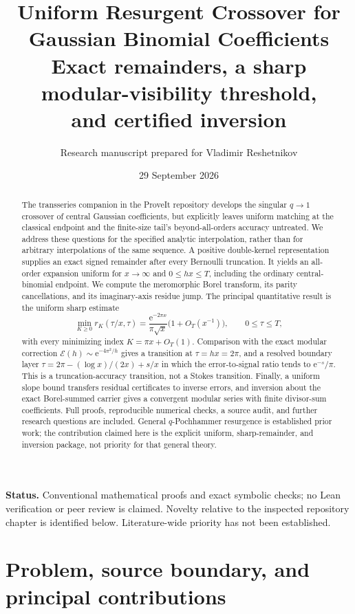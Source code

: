 \documentclass[11pt,a4paper]{article}
\title{\textbf{Uniform Resurgent Crossover for\\Gaussian Binomial Coefficients}\\[5pt]
\large Exact remainders, a sharp modular-visibility threshold,\\and certified inversion}
\author{Research manuscript prepared for Vladimir Reshetnikov}
\date{29 September 2026}
\theoremstyle{definition}
\theoremstyle{remark}
\newcommand{\e}{\mathrm e}
\newcommand{\Ecal}{\mathcal E}
\begin{document}
\maketitle
\begin{abstract}
The transseries companion in the ProveIt repository develops the singular
$q\to1$ crossover of central Gaussian coefficients, but explicitly leaves
uniform matching at the classical endpoint and the finite-size tail's
beyond-all-orders accuracy untreated. We address these questions for the
specified analytic interpolation, rather than for arbitrary interpolations
of the same sequence. A positive double-kernel representation supplies an
exact signed remainder after every Bernoulli truncation. It yields an
all-order expansion uniform for $x\to\infty$ and $0\le hx\le T$, including the
ordinary central-binomial endpoint. We compute the meromorphic Borel
transform, its parity cancellations, and its imaginary-axis residue jump.
The principal quantitative result is the uniform sharp estimate
\[
 \min_{K\ge0}r_K(\tau/x,\tau)
 =\frac{\e^{-2\pi x}}{\pi\sqrt{x}}\bigl(1+O_T(x^{-1})\bigr),
 \qquad 0\le\tau\le T,
\]
with every minimizing index $K=\pi x+O_T(1)$. Comparison with the exact
modular correction $\Ecal(h)\sim\e^{-4\pi^2/h}$ gives a transition at
$\tau=hx=2\pi$, and a resolved boundary layer
$\tau=2\pi-(\log x)/(2x)+s/x$ in which the error-to-signal ratio tends to
$\e^{-s}/\pi$. This is a truncation-accuracy transition, not a Stokes
transition. Finally, a uniform slope bound transfers residual certificates
to inverse errors, and inversion about the exact Borel-summed carrier gives
a convergent modular series with finite divisor-sum coefficients. Full
proofs, reproducible numerical checks, a source audit, and further research
questions are included. General $q$-Pochhammer resurgence is established
prior work; the contribution claimed here is the explicit uniform,
sharp-remainder, and inversion package, not priority for that general theory.
\end{abstract}
\vspace{3pt}
\noindent\textbf{Status.} Conventional mathematical proofs and exact symbolic
checks; no Lean verification or peer review is claimed. Novelty relative to
the inspected repository chapter is identified below. Literature-wide
priority has not been established.
\clearpage
{\small\setlength{\parskip}{0pt}\tableofcontents}
\clearpage

\section{Problem, source boundary, and principal contributions}
\label{sec:context}
\end{document}
